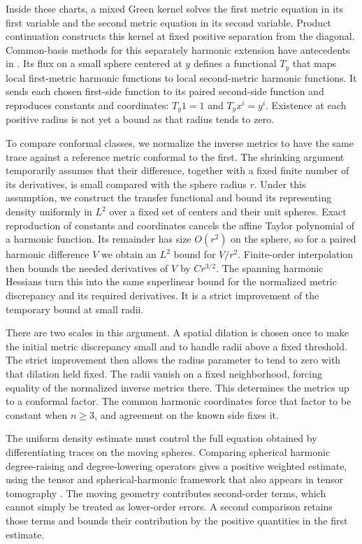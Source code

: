 Inside these charts, a mixed Green kernel solves the first metric
equation in its first variable and the second metric equation in its
second variable. Product continuation constructs this kernel at fixed
positive separation from the diagonal. Common-basis methods for this
separately harmonic extension have antecedents in \cite{Zeriahi1982}.
Its flux on a small sphere
centered at $y$ defines a functional $T_y$ that maps local first-metric
harmonic functions to local second-metric harmonic functions. It sends
each chosen first-side function to its paired second-side function and
reproduces constants and coordinates: $T_y1=1$ and $T_yx^i=y^i$.
Existence at each positive radius is not yet a bound as that radius
tends to zero.

To compare conformal classes, we normalize the inverse metrics to have
the same trace against a reference metric conformal to the first.
The shrinking argument temporarily assumes that their difference,
together with a fixed finite number of its derivatives, is small
compared with the sphere radius $r$.
Under this assumption, we construct the transfer functional and bound
its representing density uniformly in $L^2$ over a fixed set of
centers and their unit spheres. Exact reproduction of constants and coordinates cancels the
affine Taylor polynomial of a harmonic function. Its remainder has
size $O(r^2)$ on the sphere, so for a paired harmonic difference $V$
we obtain an $L^2$ bound for $V/r^2$. Finite-order interpolation then
bounds the needed derivatives of $V$ by $Cr^{3/2}$. The spanning
harmonic Hessians turn this into the same superlinear bound for the
normalized metric discrepancy and its required derivatives. It is a
strict improvement of the temporary bound at small radii.

There are two scales in this argument. A spatial dilation is chosen
once to make the initial metric discrepancy small and to handle radii
above a fixed threshold. The strict improvement then allows the radius
parameter to tend to zero with that dilation held fixed. The radii
vanish on a fixed neighborhood, forcing equality of the normalized
inverse metrics there. This determines the metrics up to a conformal
factor. The common harmonic coordinates force that factor to be
constant when $n\ge3$, and agreement on the known side fixes it.

The uniform density estimate must control the full equation obtained
by differentiating traces on the moving spheres. Comparing spherical
harmonic degree-raising and degree-lowering operators gives a positive
weighted estimate, using the tensor and spherical-harmonic framework
that also appears in tensor tomography \cite{PSU15,GPSU16}.
The moving geometry contributes second-order
terms, which cannot simply be treated as lower-order errors. A second
comparison retains those terms and bounds their contribution by the
positive quantities in the first estimate.

